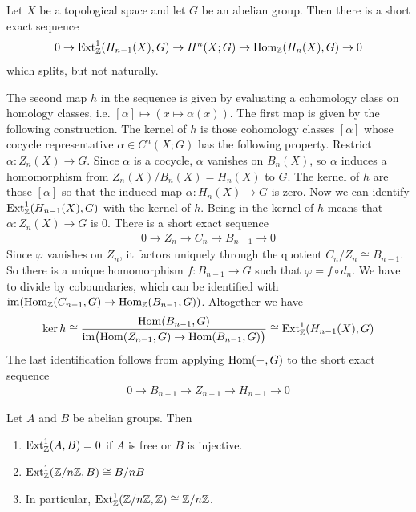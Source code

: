 \documentclass[12pt]{article}
\begin{document}
\begin{theorem}
     Let $X$ be a topological space and let $G$ be an abelian group. Then there is a short exact sequence
    \[0 \to \operatorname{Ext}^1_{\mathbb{Z}}(H_{n-1}(X),G) \to H^n(X;G) \to \operatorname{Hom}_{\mathbb{Z}}(H_n(X),G) \to 0\]
    which splits, but not naturally.
\end{theorem}
The second map $h$ in the sequence is given by evaluating a cohomology class on homology classes, i.e. $[\alpha]\mapsto (x\mapsto \alpha(x))$. The first map is given by the following construction. The kernel of $h$ is those cohomology classes $[\alpha]$ whose cocycle representative $\alpha\in C^n(X;G)$ has the following property. Restrict $\alpha:Z_n(X)\to G$. Since $\alpha$ is a cocycle, $\alpha$ vanishes on $B_n(X)$, so $\alpha$ induces a homomorphism from $Z_n(X)/B_n(X)=H_n(X)$ to $G$. The kernel of $h$ are those $[\alpha]$ so that the induced map $\alpha: H_n(X)\to G$ is zero. Now we can identify $\operatorname{Ext}_{\mathbb{Z}}^1(H_{n-1}(X),G)$ with the kernel of $h$. Being in the kernel of $h$ means that $\alpha: Z_n(X)\to G$ is $0$. There is a short exact sequence \begin{align*}
    0 \to Z_n \to C_n \to B_{n-1} \to 0
\end{align*}Since $\varphi$ vanishes on $Z_n$, it factors uniquely through the quotient $C_n/Z_n\cong B_{n-1}$. So there is a unique homomorphism $f:B_{n-1}\to G$ such that $\varphi=f\circ d_n$. We have to divide by coboundaries, which can be identified with $\operatorname{im}(\operatorname{Hom}_{\mathbb{Z}}(C_{n-1},G)\to \operatorname{Hom}_{\mathbb{Z}}(B_{n-1},G))$. Altogether we have \begin{align*}
    \ker h
\cong
\frac{\operatorname{Hom}(B_{n-1},G)}
{\operatorname{im}\bigl(\operatorname{Hom}(Z_{n-1},G)\to \operatorname{Hom}(B_{n-1},G)\bigr)} \cong \operatorname{Ext}^1_{\mathbb{Z}}(H_{n-1}(X),G)
\end{align*}
The last identification follows from applying $\operatorname{Hom}(-,G)$ to the short exact sequence \begin{align*}
0 \to B_{n-1} \to Z_{n-1} \to H_{n-1}\to 0
\end{align*}

\begin{proposition}
     Let $A$ and $B$ be abelian groups. Then \begin{enumerate}
        \item $\operatorname{Ext}^1_{\mathbb{Z}}(A,B) = 0$ if $A$ is free or $B$ is injective.
        \item $\operatorname{Ext}^1_{\mathbb{Z}}(\mathbb{Z}/n\mathbb{Z},B) \cong B/nB$
        \item In particular, $\operatorname{Ext}^1_{\mathbb{Z}}(\mathbb{Z}/n\mathbb{Z},\mathbb{Z}) \cong \mathbb{Z}/n\mathbb{Z}$.
    \end{enumerate}
\end{proposition}
\end{document}
